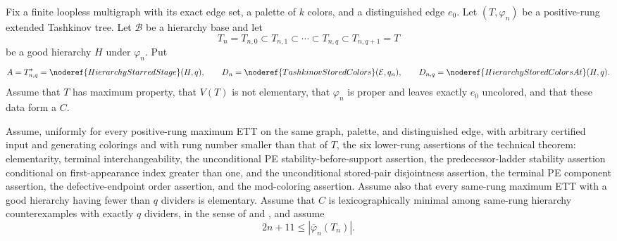 \begin{lemma}
Fix a finite loopless multigraph with its exact edge set, a palette of
$k$ colors, and a distinguished edge $e_0$.  Let $(T,\varphi_n)$ be a
positive-rung extended Tashkinov tree.  Let $\mathcal B$ be a hierarchy
base and let
\[
 T_n=T_{n,0}\subset T_{n,1}\subset\cdots\subset
 T_{n,q}\subset T_{n,q+1}=T
\]
be a good hierarchy $H$ under $\varphi_n$.  Put
\[
 A=T_{n,q}^{*}=\noderef{HierarchyStarredStage}(H,q),\qquad
 D_n=\noderef{TashkinovStoredColors}(\mathcal E,q_n),
 \qquad D_{n,q}=\noderef{HierarchyStoredColorsAt}(H,q).
\]
Assume that $T$ has maximum property, that $V(T)$ is not elementary,
that $\varphi_n$ is proper and leaves exactly $e_0$ uncolored, and that
these data form a  $C$.

Assume, uniformly for every positive-rung maximum ETT on the same graph,
palette, and distinguished edge, with arbitrary certified input and
generating colorings and with rung number smaller than that of $T$, the
six lower-rung assertions of the technical theorem: elementarity,
terminal interchangeability, the unconditional PE stability-before-support
assertion, the predecessor-ladder stability assertion conditional on
first-appearance index greater than one, and the unconditional stored-pair
disjointness assertion, the terminal PE component assertion, the defective-endpoint
order assertion, and the mod-coloring assertion.  Assume also that every
same-rung maximum ETT with a good hierarchy having fewer than $q$
dividers is elementary.  Assume that $C$ is lexicographically minimal
among same-rung hierarchy counterexamples with exactly $q$ dividers, in
the sense of  and
, and assume
\[
                 2n+11\leq |\overline\varphi_n(T_n)|.          \tag{L}
\]


\end{lemma}

